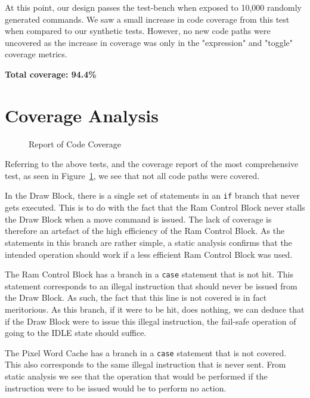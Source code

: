 \documentclass[]{article}
\begin{document}
At this point, our design passes the test-bench when exposed to 10,000 randomly generated commands. We saw a small increase in code coverage from this test when compared to our synthetic tests. However, no new code paths were uncovered as the increase in coverage was only in the "expression" and "toggle" coverage metrics.

\textbf{Total coverage: 94.4\%}



\section{Coverage Analysis} %
\label{sec:coverage_analysis}

\begin{figure}[htbp]
	\begin{center}
		
	\end{center}
	\caption{Report of Code Coverage}
	\label{fig:report_of_coverage}
\end{figure}

Referring to the above tests, and the coverage report of the most comprehensive test, as seen in Figure~\ref{fig:report_of_coverage}, we see that not all code paths were covered.

In the Draw Block, there is a single set of statements in an \verb"if" branch that never gets executed. This is to do with the fact that the Ram Control Block never stalls the Draw Block when a move command is issued. The lack of coverage is therefore an artefact of the high efficiency of the Ram Control Block. As the statements in this branch are rather simple, a static analysis confirms that the intended operation should work if a less efficient Ram Control Block was used.

\pagebreak[1] %

The Ram Control Block has a branch in a \verb"case" statement that is not hit. This statement corresponds to an illegal instruction that should never be issued from the Draw Block. As such, the fact that this line is not covered is in fact meritorious. As this branch, if it were to be hit, does nothing, we can deduce that if the Draw Block were to issue this illegal instruction, the fail-safe operation of going to the IDLE state should suffice.

The Pixel Word Cache has a branch in a \verb"case" statement that is not covered. This also corresponds to the same illegal instruction that is never sent. From static analysis we see that the operation that would be performed if the instruction were to be issued would be to perform no action.
\end{document}
